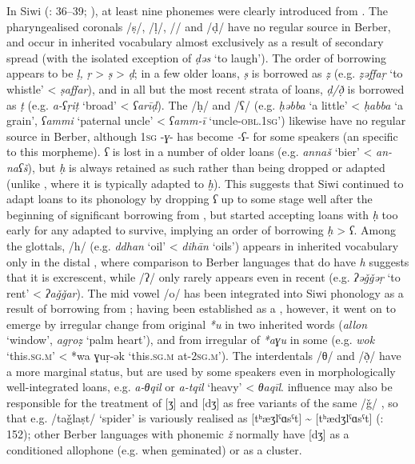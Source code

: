 \documentclass[output=paper]{langsci/langscibook}
\begin{document}
In Siwi (\citealt{Souag2013book}: 36–39; \citealt{SouagvanPutten2016}), at least nine phonemes were clearly introduced from .  The pharyngealised coronals /ṣ/, /ḷ/, /\R/ and /ḍ/ have no regular source in Berber, and occur in inherited vocabulary almost exclusively as a result of secondary  spread (with the isolated exception of \textit{ḍəs} `to laugh').  The order of borrowing appears to be \textit{ḷ,} \textit{ṛ} > \textit{ṣ} > \textit{ḍ}; in a few older loans,  \textit{ṣ} is borrowed as \textit{ẓ} (e.g. \textit{ẓəffaṛ} `to whistle' < \textit{ṣaffar}), and in all but the most recent strata of loans,  \textit{ḍ/ð̣} is borrowed as \textit{ṭ} (e.g. \textit{a-ʕṛiṭ} `broad' < \textit{ʕarīḍ}).  The  /ḥ/ and /ʕ/ (e.g. \textit{ḥəbba} `a little' < \textit{ḥabba} `a grain', \textit{ʕammi} `paternal uncle' < \textit{ʕamm-ī} `uncle-\textsc{obl.1sg}') likewise have no regular source in Berber, although 1\textsc{sg} -\textit{ɣ}{}- has become \textit{{}-ʕ}{}- for some speakers (an  specific to this morpheme). \textit{ʕ} is lost in a number of older loans (e.g. \textit{annaš} `bier' < \textit{an-naʕš}), but \textit{ḥ} is always retained as such rather than being dropped or adapted (unlike , where it is typically adapted to \textit{ḫ}).  This suggests that Siwi continued to adapt  loans to its phonology by dropping \textit{ʕ} up to some stage well after the beginning of significant borrowing from , but started accepting  loans with \textit{ḥ} too early for any adapted to survive, implying an order of borrowing \textit{ḥ} > \textit{ʕ}. Among the glottals, /h/ (e.g. \textit{ddhan} `oil' < \textit{dihān} `oils') appears in inherited vocabulary only in the distal , where comparison to Berber languages that do have \textit{h} suggests that it is excrescent, while /ʔ/ only rarely appears even in recent  (e.g. \textit{ʔəǧǧəṛ} `to rent' < \textit{ʔaǧǧar}). The mid vowel /o/ has been integrated into Siwi phonology as a result of borrowing from ; having been established as a , however, it went on to emerge by irregular change from original \textit{*u} in two inherited words (\textit{allon} `window', \textit{agṛoẓ} `palm heart'), and from irregular  of \textit{*aɣu} in some  (e.g. \textit{wok} `this\textsc{.sg.m}' < *wa ɣuṛ-ək `this.\textsc{sg.m} at-\textsc{2sg.m')}. The interdentals /θ/ and /ð̣/ have a more marginal status, but are used by some speakers even in morphologically well-integrated loans, e.g. \textit{a-θqil} or \textit{a-tqil} `heavy' < \textit{θaqīl}.  influence may also be responsible for the treatment of [ʒ] and [dʒ] as free variants of the same  /ǧ/ \citep{Vycichl2005}, so that e.g. /taǧlaṣt/ `spider' is variously realised as [tʰæʒlˤɑsˤt] {\textasciitilde} [tʰædʒlˤɑsˤt] (\citealt{Naumann2012}: 152); other Berber languages with phonemic \textit{ž} normally have [dʒ] as a conditioned allophone (e.g. when geminated) or as a cluster.
\end{document}

